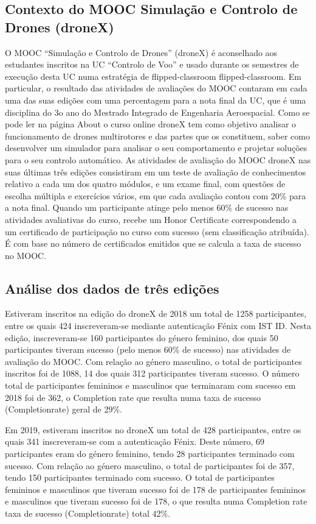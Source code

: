 \subsection{Contexto do MOOC Simulação e Controlo de Drones (droneX)}

O MOOC “Simulação e Controlo de Drones” (droneX) é aconselhado aos estudantes
inscritos na UC “Controlo de Voo” e usado durante os semestres de execução desta
UC numa estratégia de flipped-classroom
flipped-classroom. Em particular, o resultado das atividades de avaliações do MOOC contaram em cada uma das suas edições com uma
percentagem para a nota final da UC, que é uma disciplina do 3o ano do Mestrado Integrado de Engenharia Aeroespacial. Como se pode ler na página About o curso online droneX tem como objetivo analisar o funcionamento de drones multirotores e das partes que os constituem,
saber como desenvolver um simulador para analisar o seu comportamento e projetar soluções para o seu controlo automático.
As atividades de avaliação do MOOC droneX nas suas últimas três edições consistiram em um teste de avaliação de conhecimentos relativo a cada um dos quatro módulos, e um exame final, com questões de escolha múltipla e exercícios
vários, em que cada avaliação contou com 20\% para a nota final. Quando um participante atinge pelo menos 60\% de sucesso nas atividades avaliativas do curso, recebe um Honor Certificate correspondendo a um certificado de participação no curso com sucesso (sem classificação atribuída). É com base no número de certificados emitidos que se calcula a taxa de sucesso no MOOC.


\subsection{Análise dos dados de três edições}

Estiveram inscritos na edição do droneX de 2018 um total de 1258 participantes, entre os quais 424 inscreveram-se mediante autenticação Fénix com IST ID. Nesta edição, inscreveram-se 160 participantes do género feminino, dos quais 50 participantes tiveram sucesso (pelo menos 60\% de sucesso) nas atividades de avaliação do MOOC. Com relação ao género masculino, o total de participantes inscritos foi de 1088, 14 dos quais 312 participantes tiveram sucesso. O número total de participantes femininos e masculinos que terminaram com sucesso em 2018 foi de 362, o Completion rate que resulta numa taxa de sucesso (Completionrate) geral de 29\%.

Em 2019, estiveram inscritos no droneX um
total de 428 participantes, entre os quais 341
inscreveram-se com a autenticação Fénix. Deste número, 69 participantes eram do género feminino, tendo 28 participantes terminado com sucesso. Com relação ao género masculino, o total de participantes foi de 357, tendo 150 participantes terminado com sucesso. O total de participantes femininos e masculinos que tiveram sucesso foi de 178 de participantes femininos e masculinos que tiveram sucesso foi de 178, o que resulta numa Completion rate
taxa de sucesso (Completionrate) total 42\%.

